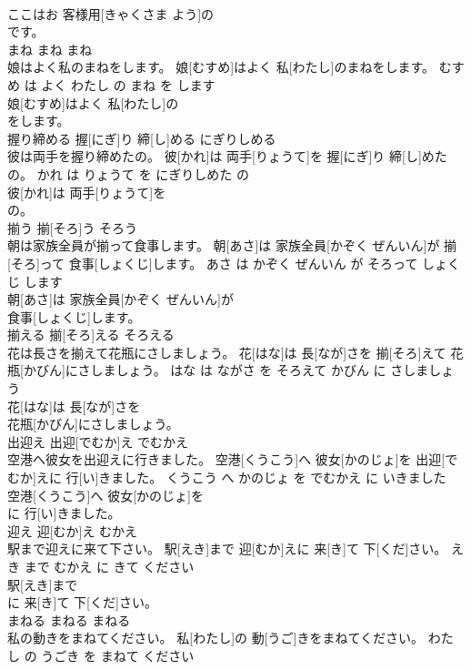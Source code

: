 \documentclass[8pt]{extreport}
\begin{document}
\begin{CJK}{UTF8}{min}
\\	ここはお 客様用[きゃくさま よう]の
\\	です。			
\\	まね	まね	まね	
\\	娘はよく私のまねをします。	娘[むすめ]はよく 私[わたし]のまねをします。	むすめ は よく わたし の まね を します	
\\	娘[むすめ]はよく 私[わたし]の
\\	をします。			
\\	握り締める	握[にぎ]り 締[し]める	にぎりしめる	
\\	彼は両手を握り締めたの。	彼[かれ]は 両手[りょうて]を 握[にぎ]り 締[し]めたの。	かれ は りょうて を にぎりしめた の	
\\	彼[かれ]は 両手[りょうて]を
\\	の。			
\\	揃う	揃[そろ]う	そろう	
\\	朝は家族全員が揃って食事します。	朝[あさ]は 家族全員[かぞく ぜんいん]が 揃[そろ]って 食事[しょくじ]します。	あさ は かぞく ぜんいん が そろって しょくじ します	
\\	朝[あさ]は 家族全員[かぞく ぜんいん]が
\\	食事[しょくじ]します。			
\\	揃える	揃[そろ]える	そろえる	
\\	花は長さを揃えて花瓶にさしましょう。	花[はな]は 長[なが]さを 揃[そろ]えて 花瓶[かびん]にさしましょう。	はな は ながさ を そろえて かびん に さしましょう	
\\	花[はな]は 長[なが]さを
\\	花瓶[かびん]にさしましょう。			
\\	出迎え	出迎[でむか]え	でむかえ	
\\	空港へ彼女を出迎えに行きました。	空港[くうこう]へ 彼女[かのじょ]を 出迎[でむか]えに 行[い]きました。	くうこう へ かのじょ を でむかえ に いきました	
\\	空港[くうこう]へ 彼女[かのじょ]を
\\	に 行[い]きました。			
\\	迎え	迎[むか]え	むかえ	
\\	駅まで迎えに来て下さい。	駅[えき]まで 迎[むか]えに 来[き]て 下[くだ]さい。	えき まで むかえ に きて ください	
\\	駅[えき]まで
\\	に 来[き]て 下[くだ]さい。			
\\	まねる	まねる	まねる	
\\	私の動きをまねてください。	私[わたし]の 動[うご]きをまねてください。	わたし の うごき を まねて ください	

\end{CJK}
\end{document}
